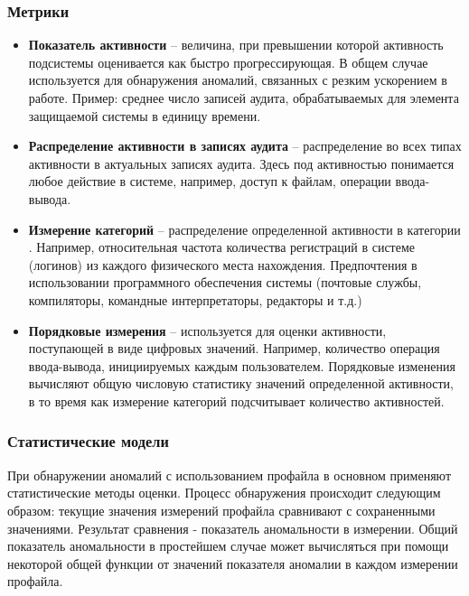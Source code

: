 \subsubsection{Метрики}

\begin{itemize}
	\item \textbf{Показатель активности} -- величина, при превышении которой активность 
	подсистемы оценивается как быстро прогрессирующая. В общем случае используется для 
	обнаружения аномалий, связанных с резким ускорением в работе. Пример: среднее число 
	записей аудита, обрабатываемых для элемента защищаемой системы в единицу времени.

	\item \textbf{Распределение активности в записях аудита} -- распределение во всех типах 
	активности в актуальных записях аудита. Здесь под активностью понимается любое действие 
	в системе, например, доступ к файлам, операции ввода-вывода.

	\item \textbf{Измерение категорий} -- распределение определенной активности в 
	категории \footnotemark. Например, относительная частота количества регистраций в 
	системе (логинов) из каждого физического места нахождения. Предпочтения в использовании 
	программного обеспечения системы (почтовые службы, компиляторы, командные интерпретаторы, 
	редакторы и т.д.)

	\item \textbf{Порядковые измерения} -- используется для оценки активности, поступающей 
	в виде цифровых значений. Например, количество операция ввода-вывода, инициируемых каждым 
	пользователем. Порядковые изменения вычисляют общую числовую статистику значений определенной 
	активности, в то время как измерение категорий подсчитывает количество активностей.
\end{itemize}




\subsubsection{Статистические модели}

При обнаружении аномалий с использованием профайла в основном применяют статистические 
методы оценки. Процесс обнаружения происходит следующим образом: текущие значения измерений 
профайла сравнивают с сохраненными значениями. Результат сравнения - показатель аномальности 
в измерении. Общий показатель аномальности в простейшем случае может вычисляться при помощи 
некоторой общей функции от значений показателя аномалии в каждом измерении профайла.

